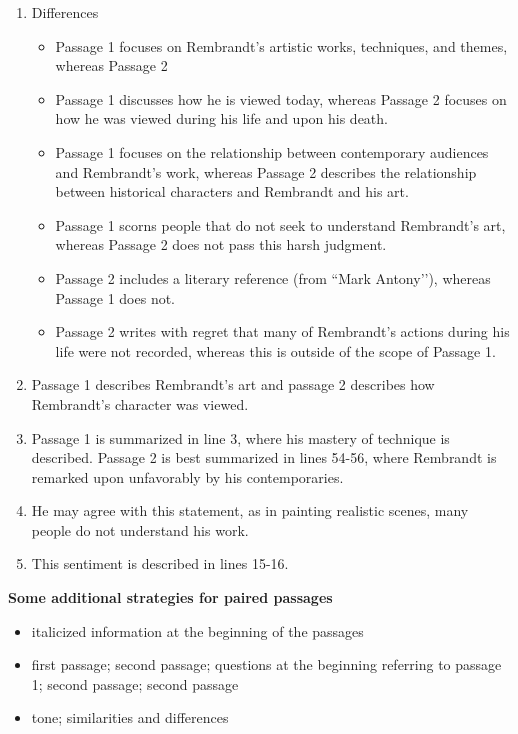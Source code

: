 \begin{enumerate}
\begin{enumerate}
\item Differences

\begin{itemize}
\item Passage 1 focuses on Rembrandt's artistic works, techniques, and themes, whereas Passage 2 
\item Passage 1 discusses how he is viewed today, whereas Passage 2 focuses on how he was viewed during his life and upon his death. 
\item Passage 1 focuses on the relationship between contemporary audiences and Rembrandt's work, whereas Passage 2 describes the relationship between historical characters and Rembrandt and his art. 
\item Passage 1 scorns people that do not seek to understand Rembrandt's art, whereas Passage 2 does not pass this harsh judgment. 
\item Passage 2 includes a literary reference (from ``Mark Antony’’), whereas Passage 1 does not. 
\item Passage 2 writes with regret that many of Rembrandt's actions during his life were not recorded, whereas this is outside of the scope of Passage 1.
\end{itemize}

\item Passage 1 describes Rembrandt's art and passage 2 describes how Rembrandt's character was viewed. 
\item Passage 1 is summarized in line 3, where his mastery of technique is described. Passage 2 is best summarized in lines 54-56, where Rembrandt is remarked upon unfavorably by his contemporaries. 
\item He may agree with this statement, as in painting realistic scenes, many people do not understand his work. 
\item This sentiment is described in lines 15-16. 
\end{enumerate}

\bigskip
\textbf{Some additional strategies for paired passages}

\begin{itemize}
\item italicized information at the beginning of the passages
\item first passage; second passage; questions at the beginning referring to passage 1; second passage; second passage
\item tone; similarities and differences
\end{itemize}


\end{enumerate}
